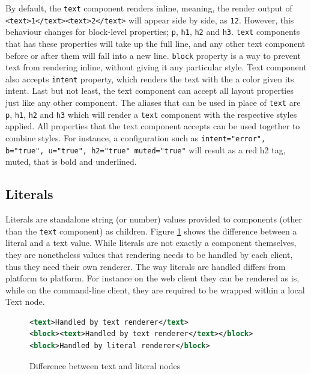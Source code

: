By default, the \texttt{text} component renders inline, meaning, the render output of \texttt{<text>1</text><text>2</text>} will appear side by side, as \texttt{12}. However, this behaviour changes for block-level properties; \texttt{p}, \texttt{h1}, \texttt{h2} and \texttt{h3}. \texttt{text} components that has these properties will take up the full line, and any other text component before or after them will fall into a new line. \texttt{block} property is a way to prevent text from rendering inline, without giving it any particular style. Text component also accepts \texttt{intent} property, which renders the text with the a color given its intent. Last but not least, the text component can accept all layout properties just like any other component. The aliases that can be used in place of \texttt{text} are \texttt{p}, \texttt{h1}, \texttt{h2} and \texttt{h3} which will render a \texttt{text} component with the respective styles applied. All properties that the text component accepts can be used together to combine styles. For instance, a configuration such as \texttt{intent="error", b="true", u="true", h2="true" muted="true"} will result as a red h2 tag, muted, that is bold and underlined.

\subsection{Literals}

Literals are standalone string (or number) values provided to components (other than the \texttt{text} component) as children. Figure \ref{fig:text_vs_literal} shows the difference between a literal and a text value. While literals are not exactly a component themselves, they are nonetheless values that rendering needs to be handled by each client, thus they need their own renderer. The way literals are handled differs from platform to platform. For instance on the web client they can be rendered as is, while on the command-line client, they are required to be wrapped within a local Text node.

\begin{figure}
\begin{minipage}{\linewidth}
\begin{lstlisting}[language=xml]
<text>Handled by text renderer</text>
<block><text>Handled by text renderer</text></block>
<block>Handled by literal renderer</block>
\end{lstlisting}
\end{minipage}
\caption{Difference between text and literal nodes}%
\label{fig:text_vs_literal}%
\end{figure}

